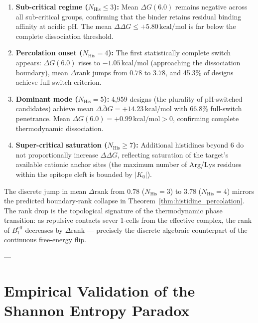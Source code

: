 \begin{enumerate}[leftmargin=1.2cm]
    \item \textbf{Sub-critical regime ($N_{\text{His}} \le 3$):}  Mean
          $\Delta G(6.0)$ remains negative across all sub-critical groups,
          confirming that the binder retains residual binding affinity at
          acidic pH.  The mean $\Delta\Delta G \le +5.80\,\text{kcal/mol}$
          is far below the complete dissociation threshold.

    \item \textbf{Percolation onset ($N_{\text{His}} = 4$):}  The first
          statistically complete switch appears: $\Delta G(6.0)$ rises to
          $-1.05\,\text{kcal/mol}$ (approaching the dissociation boundary),
          mean $\Delta\text{rank}$ jumps from $0.78$ to $3.78$, and 45.3\%
          of designs achieve full switch criterion.

    \item \textbf{Dominant mode ($N_{\text{His}} = 5$):}  4,959 designs
          (the plurality of pH-switched candidates) achieve mean
          $\overline{\Delta\Delta G} = +14.23\,\text{kcal/mol}$ with 66.8\%
          full-switch penetrance.  Mean $\Delta G(6.0) = +0.99\,\text{kcal/mol} > 0$,
          confirming complete thermodynamic dissociation.

    \item \textbf{Super-critical saturation ($N_{\text{His}} \ge 7$):}
          Additional histidines beyond 6 do not proportionally increase
          $\Delta\Delta G$, reflecting saturation of the target's available
          cationic anchor sites (the maximum number of Arg/Lys residues
          within the epitope cleft is bounded by $|K_0|$).
\end{enumerate}

\begin{remark}
The discrete jump in mean $\Delta\text{rank}$ from $0.78$ ($N_{\text{His}} = 3$)
to $3.78$ ($N_{\text{His}} = 4$) mirrors the predicted boundary-rank collapse
in Theorem~\ref{thm:histidine_percolation}.  The rank drop is the topological
signature of the thermodynamic phase transition: as repulsive contacts sever
1-cells from the effective complex, the rank of $B_1^{\text{eff}}$ decreases
by $\Delta\text{rank}$ --- precisely the discrete algebraic counterpart of
the continuous free-energy flip.
\end{remark}

---

\section{Empirical Validation of the Shannon Entropy Paradox}
\label{sec:entropy_paradox}

